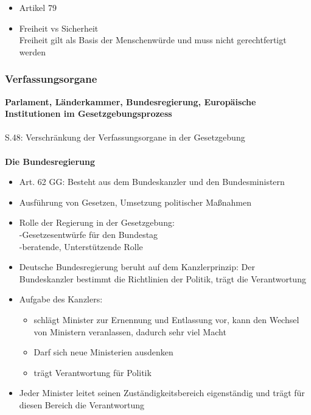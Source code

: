 \documentclass[12pt, letterpaper]{article}
\begin{document}
\begin{itemize}
\begin{itemize}
\begin{itemize}
  \end{itemize}
\item Artikel 79


  \item Freiheit vs Sicherheit\\
    Freiheit gilt als Basis der Menschenwürde und muss nicht gerechtfertigt werden\\
    

\end{itemize}

\newpage
\subsubsection{Verfassungsorgane}
\label{sec:Verfassungsorgane}

\textbf{Parlament, Länderkammer, Bundesregierung, Europäische Institutionen im Gesetzgebungsprozess} \\\\
S.48: Verschränkung der Verfassungsorgane in der Gesetzgebung\\\\
\textbf{Die Bundesregierung}
\begin{itemize}
  \item Art. 62 GG: Besteht aus dem Bundeskanzler und den Bundesministern
  \item Ausführung von Gesetzen, Umsetzung politischer Maßnahmen
  \item Rolle der Regierung in der Gesetzgebung:\\
    -Gesetzesentwürfe für den Bundestag\\
    -beratende, Unterstützende Rolle
  \item Deutsche Bundesregierung beruht auf dem Kanzlerprinzip: Der Bundeskanzler bestimmt die Richtlinien der Politik, trägt die Verantwortung
  \item Aufgabe des Kanzlers: 
    \begin{itemize}
      \item schlägt Minister zur Ernennung und Entlassung vor, kann den Wechsel von Ministern veranlassen, dadurch sehr viel Macht
      \item Darf sich neue Ministerien ausdenken
      \item trägt Verantwortung für Politik
    \end{itemize}
  \item Jeder Minister leitet seinen Zuständigkeitsbereich eigenständig und trägt für diesen Bereich die Verantwortung
\end{itemize}


\end{itemize}
\end{document}
